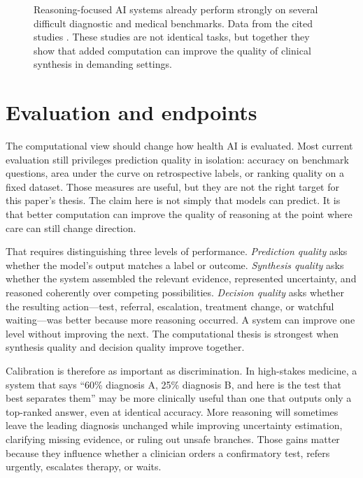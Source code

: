 \documentclass[11pt]{article}
\begin{document}
\begin{figure}[t]
\caption{Reasoning-focused AI systems already perform strongly on several difficult diagnostic and medical benchmarks. Data from the cited studies \citep{kanjee2023,singhal2025,moell2025reasoning}. These studies are not identical tasks, but together they show that added computation can improve the quality of clinical synthesis in demanding settings.}
\label{fig:ai_performance}
\end{figure}

\section{Evaluation and endpoints}
The computational view should change how health AI is evaluated. Most current evaluation still privileges prediction quality in isolation: accuracy on benchmark questions, area under the curve on retrospective labels, or ranking quality on a fixed dataset. Those measures are useful, but they are not the right target for this paper's thesis. The claim here is not simply that models can predict. It is that better computation can improve the quality of reasoning at the point where care can still change direction.

That requires distinguishing three levels of performance. \emph{Prediction quality} asks whether the model's output matches a label or outcome. \emph{Synthesis quality} asks whether the system assembled the relevant evidence, represented uncertainty, and reasoned coherently over competing possibilities. \emph{Decision quality} asks whether the resulting action---test, referral, escalation, treatment change, or watchful waiting---was better because more reasoning occurred. A system can improve one level without improving the next. The computational thesis is strongest when synthesis quality and decision quality improve together.

Calibration is therefore as important as discrimination. In high-stakes medicine, a system that says ``60\% diagnosis A, 25\% diagnosis B, and here is the test that best separates them'' may be more clinically useful than one that outputs only a top-ranked answer, even at identical accuracy. More reasoning will sometimes leave the leading diagnosis unchanged while improving uncertainty estimation, clarifying missing evidence, or ruling out unsafe branches. Those gains matter because they influence whether a clinician orders a confirmatory test, refers urgently, escalates therapy, or waits.
\end{document}
